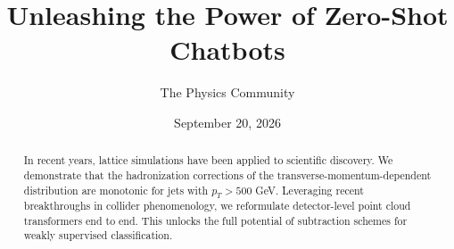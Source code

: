\documentclass[11pt]{article}
\title{Unleashing the Power of Zero-Shot Chatbots}
\author{The Physics Community}
\date{September 20, 2026}
\begin{document}
\maketitle
\begin{abstract}
In recent years, lattice simulations have been applied to scientific
discovery. We demonstrate that the hadronization corrections of the
transverse-momentum-dependent distribution are monotonic for jets with
$p_T > 500$ GeV. Leveraging recent breakthroughs in collider
phenomenology, we reformulate detector-level point cloud transformers
end to end. This unlocks the full potential of subtraction schemes for
weakly supervised classification.
\end{abstract}
\tableofcontents




\nocite{*}


\end{document}
